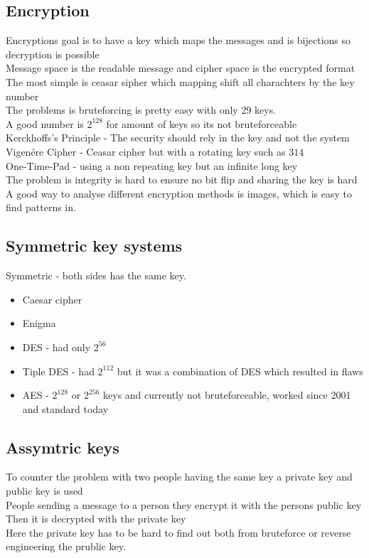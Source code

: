 \documentclass[12pt, a4paper]{article}
\begin{document}
			\subsection{Encryption}
				Encryptions goal is to have a key which maps the messages and is bijections so decryption is possible\\
				Message space is the readable message and cipher space is the encrypted format\\
				The most simple is ceasar sipher which mapping shift all charachters by the key number\\
				The problems is bruteforcing is pretty easy with only 29 keys.\\
				A good number is $2^{128}$ for amount of keys so its not bruteforceable\\
				Kerckhoffs's Principle - The security should rely in the key and not the system\\
				Vigenére Cipher - Ceasar cipher but with a rotating key such as $314$\\
				One-Time-Pad - using a non repeating key but an infinite long key\\
				The problem is integrity is hard to ensure no bit flip and sharing the key is hard\\
				A good way to analyse different encryption methods is images, which is easy to find patterns in.\\
			\subsection{Symmetric key systems}
				Symmetric - both sides has the same key.\\
				\begin{itemize}
					\item Caesar cipher
					\item Enigma
					\item DES - had only $2^56$
					\item Tiple DES - had $2^112$ but it was a combination of DES which resulted in flaws
					\item AES - $2^{128}$ or $2^{256}$ keys and currently not bruteforceable, worked since 2001 and standard today
				\end{itemize}
			\subsection{Assymtric keys}
				To counter the problem with two people having the same key a private key and public key is used\\
				People sending a message to a person they encrypt it with the persons public key\\
				Then it is decrypted with the private key\\
				Here the private key has to be hard to find out both from bruteforce or reverse engineering the prublic key.\\
\end{document}
